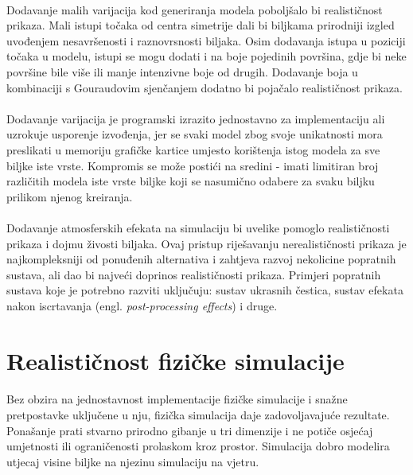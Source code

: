 \documentclass[times, utf8, diplomski]{fer}
\begin{document}
\paragraph{}
Dodavanje malih varijacija kod generiranja modela poboljšalo bi realističnost 
prikaza. Mali istupi točaka od centra simetrije dali bi biljkama prirodniji
izgled uvođenjem nesavršenosti i raznovrsnosti biljaka. Osim dodavanja istupa
u poziciji točaka u modelu, istupi se mogu dodati i na boje pojedinih površina,
gdje bi neke površine bile više ili manje intenzivne boje od drugih. Dodavanje
boja u kombinaciji s Gouraudovim sjenčanjem dodatno bi pojačalo realističnost
prikaza.
\paragraph{}
Dodavanje varijacija je programski izrazito jednostavno za implementaciju ali
uzrokuje usporenje izvođenja, jer se svaki model zbog svoje unikatnosti mora
preslikati u memoriju grafičke kartice umjesto korištenja istog modela za sve 
biljke iste vrste. Kompromis se može postići na sredini - imati limitiran broj 
različitih modela iste vrste biljke koji se nasumično odabere za svaku biljku 
prilikom njenog kreiranja.
\paragraph{}
Dodavanje atmosferskih efekata na simulaciju bi uvelike pomoglo realističnosti
prikaza i dojmu živosti biljaka. Ovaj pristup riješavanju nerealističnosti 
prikaza je najkompleksniji od ponuđenih alternativa i zahtjeva razvoj nekolicine 
popratnih sustava, ali dao bi najveći doprinos realističnosti prikaza. Primjeri 
popratnih sustava koje je potrebno razviti uključuju: sustav ukrasnih čestica, 
sustav efekata nakon iscrtavanja (engl. \textit{post-processing effects}) i 
druge. 

\section{Realističnost fizičke simulacije}
\paragraph{}
Bez obzira na jednostavnost implementacije fizičke simulacije i snažne
pretpostavke uključene u nju, fizička simulacija daje zadovoljavajuće rezultate.
Ponašanje prati stvarno prirodno gibanje u tri dimenzije i ne potiče osjećaj 
umjetnosti ili ograničenosti prolaskom kroz prostor. Simulacija dobro modelira
utjecaj visine biljke na njezinu simulaciju na vjetru. 
\end{document}
